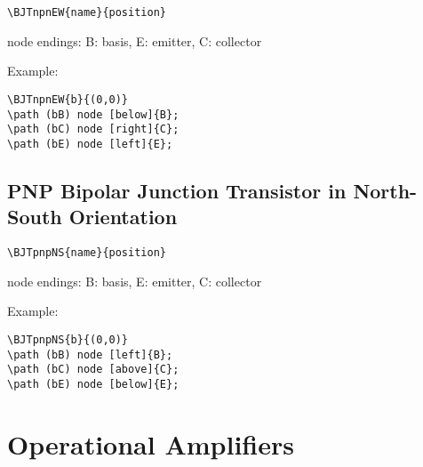 \documentclass[parskip=full]{scrartcl}
\begin{document}
\begin{verbatim}
\BJTnpnEW{name}{position}
\end{verbatim}
node endings: B: basis, E: emitter, C: collector

Example:\\
\begin{minipage}{0.8\textwidth}
\begin{verbatim}
\BJTnpnEW{b}{(0,0)}
\path (bB) node [below]{B};
\path (bC) node [right]{C};
\path (bE) node [left]{E};
\end{verbatim}
\end{minipage}
\begin{minipage}{0.19\textwidth}
\end{minipage}

\subsection{PNP Bipolar Junction Transistor in North-South Orientation}

\begin{verbatim}
\BJTpnpNS{name}{position}
\end{verbatim}
node endings: B: basis, E: emitter, C: collector

Example:\\
\begin{minipage}{0.8\textwidth}
\begin{verbatim}
\BJTpnpNS{b}{(0,0)}
\path (bB) node [left]{B};
\path (bC) node [above]{C};
\path (bE) node [below]{E};
\end{verbatim}
\end{minipage}
\begin{minipage}{0.19\textwidth}
\end{minipage}

\section{Operational Amplifiers}
\end{document}
